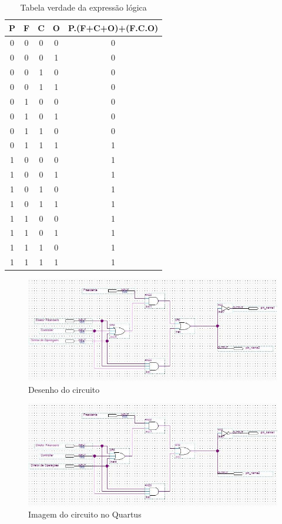 	\begin{table}[h]
		\centering
		\caption{Tabela verdade da expressão lógica}\label{table:tabelaVerdade1}
		\begin{tabular}{c|c|c|c|c}
			\textbf{P} & \textbf{F} & \textbf{C} & \textbf{O} & \textbf{P.(F+C+O)+(F.C.O)} \\
			\hline
			0 & 0 & 0 & 0 & 0\\\hline
			0 & 0 & 0 & 1 & 0\\\hline
			0 & 0 & 1 & 0 & 0\\\hline
			0 & 0 & 1 & 1 & 0\\\hline
			0 & 1 & 0 & 0 & 0\\\hline
			0 & 1 & 0 & 1 & 0\\\hline
			0 & 1 & 1 & 0 & 0\\\hline
			0 & 1 & 1 & 1 & 1\\\hline
			1 & 0 & 0 & 0 & 1\\\hline
			1 & 0 & 0 & 1 & 1\\\hline
			1 & 0 & 1 & 0 & 1\\\hline
			1 & 0 & 1 & 1 & 1\\\hline
			1 & 1 & 0 & 0 & 1\\\hline
			1 & 1 & 0 & 1 & 1\\\hline
			1 & 1 & 1 & 0 & 1\\\hline
			1 & 1 & 1 & 1 & 1\\\hline

		\end{tabular}
	\end{table}

	\begin{figure}[H]
		\centering
		\caption{\label{fig:desenhoCircuito1}Desenho do circuito}
		\includegraphics[width=1\textwidth]{img/cenario1/desenhoCircuito}
	\end{figure}

	\begin{figure}[H]
		\centering
		\caption{\label{fig:printCircuito1}Imagem do circuito no Quartus}
		\includegraphics[width=1\textwidth]{img/cenario1/desenhoCircuito}
	\end{figure}

